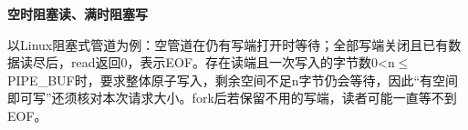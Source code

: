 {\color{ink}\bfseries 空时阻塞读、满时阻塞写}\par\vspace{1bp}以Linux阻塞式管道为例：空管道在仍有写端打开时等待；全部写端关闭且已有数据读尽后，read返回0，表示EOF。存在读端且一次写入的字节数0<n\(\le \)PIPE\_BUF时，要求整体原子写入，剩余空间不足n字节仍会等待，因此“有空间即可写”还须核对本次请求大小。fork后若保留不用的写端，读者可能一直等不到EOF。
